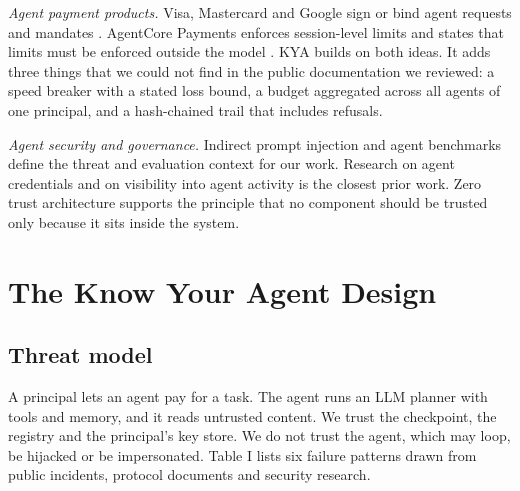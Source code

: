 \documentclass[conference]{IEEEtran}
\begin{document}
\emph{Agent payment products.} Visa, Mastercard and Google sign or bind agent requests and mandates \cite{b1,b2,b3}. AgentCore Payments enforces session-level limits and states that limits must be enforced outside the model \cite{b4,b25}. KYA builds on both ideas. It adds three things that we could not find in the public documentation we reviewed: a speed breaker with a stated loss bound, a budget aggregated across all agents of one principal, and a hash-chained trail that includes refusals.

\emph{Agent security and governance.} Indirect prompt injection \cite{b9} and agent benchmarks \cite{b26} define the threat and evaluation context for our work. Research on agent credentials \cite{b27} and on visibility into agent activity \cite{b28} is the closest prior work. Zero trust architecture \cite{b29} supports the principle that no component should be trusted only because it sits inside the system.

\section{The Know Your Agent Design}

\subsection{Threat model}

A principal lets an agent pay for a task. The agent runs an LLM planner with tools and memory, and it reads untrusted content. We trust the checkpoint, the registry and the principal's key store. We do not trust the agent, which may loop, be hijacked or be impersonated. Table I lists six failure patterns drawn from public incidents, protocol documents and security research.
\end{document}
